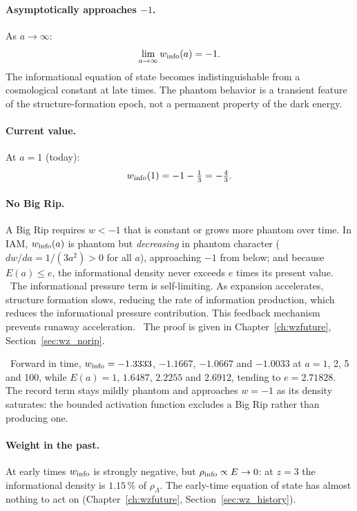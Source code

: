 \paragraph{Asymptotically approaches $-1$.} As $a\to\infty$:
\begin{equation}\lim_{a\to\infty}w_{\rm info}(a)=-1 .\label{eq:de_wlim}\end{equation}
The informational equation of state becomes indistinguishable from a cosmological constant at late times. The phantom behavior is a transient
feature of the structure-formation epoch, not a permanent property of the dark energy. \derived

\paragraph{Current value.} At $a=1$ (today):
\begin{equation}w_{\rm info}(1)=-1-\tfrac13=-\tfrac43 .\label{eq:de_w1}\end{equation}
\derived

\paragraph{No Big Rip.} A Big Rip requires $w<-1$ that is constant or grows more phantom over time. In IAM, $w_{\rm info}(a)$ is phantom but
\emph{decreasing} in phantom character ($dw/da=1/(3a^2)>0$ for all $a$), approaching $-1$ from below; and because $E(a)\le e$, the
informational density never exceeds $e$ times its present value. \derived\ The informational pressure term is self-limiting. As expansion
accelerates, structure formation slows, reducing the rate of information production, which reduces the informational pressure contribution.
This feedback mechanism prevents runaway acceleration. \interp\ The proof is given in Chapter~\ref{ch:wzfuture}, Section~\ref{sec:wz_norip}.

\calc\ Forward in time, $w_{\rm info}=-1.3333$, $-1.1667$, $-1.0667$ and $-1.0033$ at $a=1$, 2, 5 and 100, while $E(a)=1$, $1.6487$, $2.2255$ and
$2.6912$, tending to $e=2.71828$. The record term stays mildly phantom and approaches $w=-1$ as its density saturates: the bounded activation
function excludes a Big Rip rather than producing one. \interp

\paragraph{Weight in the past.} At early times $w_{\rm info}$ is strongly negative, but $\rho_{\rm info}\propto E\to0$: at $z=3$ the
informational density is $1.15\,\%$ of $\rho_\Lambda$. The early-time equation of state has almost nothing to act on (Chapter~\ref{ch:wzfuture},
Section~\ref{sec:wz_history}). \calc

